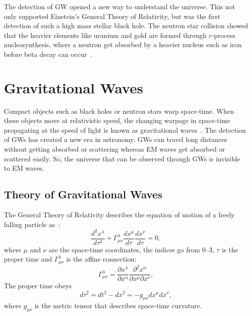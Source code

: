 \documentclass{ttuthes2007}
\begin{document}
The detection of \ac{GW} opened a new way to understand the universe. This not
only supported Einstein's General Theory of Relativity, but was the first
detection of such a high mass stellar black hole. The neutron star collision showed that the
heavier elements like uranium and gold are formed through $r$-process
nucleosynthesis, where a neutron get absorbed by a heavier nucleus such as
iron before beta decay can occur~\cite{Abbott_2017c}.



\chapter{\textbf{Gravitational Waves}}
Compact objects such as black holes or neutron stars warp space-time. When
these objects move at relativistic speed, the changing warpage in space-time
propagating at the speed of light is known as gravitational
waves~\cite{thorne1995gravitational}. The detection of \acp{GW} has created a
new era in astronomy.  \acp{GW} can travel long distances without getting
absorbed or scattering whereas \ac{EM} waves get absorbed or scattered easily. So, the
universe that can be observed through \acp{GW} is invisible to \ac{EM} waves. 

\section{Theory of Gravitational Waves}
The General Theory of Relativity describes the equation of motion of a freely
falling particle as~\cite{carroll1997lecture, 2003gieg.book.....H}:
\begin{equation}
\frac{d^2x^\lambda}{d\tau^2}+\Gamma^\lambda_{\mu\nu}\frac{dx^\mu}{d\tau}\frac{dx^\nu}{d\tau}=0,
\end{equation}
where $\mu$ and $\nu$ are the space-time coordinates, the indices go from 0--3,
$\tau$ is the proper time and  $\Gamma^\lambda_{\mu\nu}$ is the affine connection:
\begin{equation}
\Gamma^\lambda_{\mu\nu} =\frac{\partial x^\lambda}{\partial
x^\alpha}\frac{\partial^2x^\alpha}{\partial x^\mu \partial x^\nu} ,
\end{equation}
The proper time obeys
\begin{equation}
d\tau^2=dt^2 - dx^2 = -g_{\mu\nu}dx^\mu dx^\nu,
\end{equation}
where $g_{\mu\nu}$ is the metric tensor that describes space-time curvature.
\end{document}
